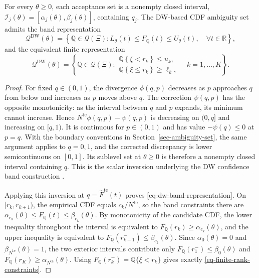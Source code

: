 \begin{proposition}
  \label{prop-finite-rank-constraints}
  For every $\theta\ge0$, each acceptance set is a nonempty closed interval,
  $\mathcal I_j(\theta)=[\alpha_j(\theta),\beta_j(\theta)]$, containing $q_j$. The DW-based CDF ambiguity set admits the band representation
  \begin{equation}
    \mathscr Q^{\mathrm{DW}}(\theta)=
    \left\{\mathbb Q\in\mathcal Q(\Xi):
    L_\theta(t)\le F_{\mathbb Q}(t)\le U_\theta(t),\quad\forall t\in\mathbb R\right\},
    \label{eq-dw-band-representation}
  \end{equation}
  and the equivalent finite representation
  \begin{equation}
    \mathscr Q^{\mathrm{DW}}(\theta)=
    \left\{\mathbb Q\in\mathcal Q(\Xi):
    \begin{array}{ll}
      \mathbb Q\left\{\xi<r_k\right\}\le u_k,\\
      \mathbb Q\left\{\xi\le r_k\right\}\ge\ell_k,
    \end{array}
    \quad k=1,\ldots,K\right\}.
    \label{eq-finite-rank-constraints}
  \end{equation}
\end{proposition}
\begin{proof}
  For fixed $q\in(0,1)$, the divergence $\phi(q,p)$ decreases as $p$ approaches $q$ from below and increases as $p$ moves above $q$. The correction $\psi(q,p)$ has the opposite monotonicity: as the interval between $q$ and $p$ expands, its minimum cannot increase. Hence $N^{\mathrm{te}}\phi(q,p)-\psi(q,p)$ is decreasing on $(0,q]$ and increasing on $[q,1)$. It is continuous for $p\in(0,1)$ and has value $-\psi(q)\le0$ at $p=q$. With the boundary conventions in Section~\ref{sec-ambiguity-set}, the same argument applies to $q=0,1$, and the corrected discrepancy is lower semicontinuous on $[0,1]$. Its sublevel set at $\theta\ge0$ is therefore a nonempty closed interval containing $q$. This is the scalar inversion underlying the DW confidence band construction \citep[Supplement, Section~S.6]{L.J23}.

  Applying this inversion at $q=\widehat F^{\mathrm{te}}(t)$ proves \eqref{eq-dw-band-representation}. On $[r_k,r_{k+1})$, the empirical CDF equals $c_k/N^{\mathrm{te}}$, so the band constraints there are
  $\alpha_{c_k}(\theta)\le F_{\mathbb Q}(t)\le\beta_{c_k}(\theta)$.
  By monotonicity of the candidate CDF, the lower inequality throughout the interval is equivalent to
  $F_{\mathbb Q}(r_k)\ge\alpha_{c_k}(\theta)$, and the upper inequality is equivalent to
  $F_{\mathbb Q}(r_{k+1}^-)\le\beta_{c_k}(\theta)$.
  Since $\alpha_0(\theta)=0$ and $\beta_{N^{\mathrm{te}}}(\theta)=1$, the two exterior intervals contribute only
  $F_{\mathbb Q}(r_1^-)\le\beta_0(\theta)$ and
  $F_{\mathbb Q}(r_K)\ge\alpha_{N^{\mathrm{te}}}(\theta)$.
  Using $F_{\mathbb Q}(r_k^-)=\mathbb Q\{\xi<r_k\}$ gives exactly \eqref{eq-finite-rank-constraints}.
\end{proof}

